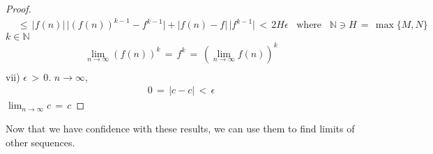 \begin{theorem}
\begin{proof}
\begin{align*}
        &\leq \hspace{2pt} \lvert f(n) \rvert \hspace{2pt} \lvert (f(n))^{k - 1} - f^{k - 1} \rvert + \lvert f(n) - f \rvert \hspace{2pt} \lvert f^{k - 1} \rvert \hspace{2pt} < \hspace{2pt} 2H \epsilon \hspace{10pt} \text{where} \hspace{10pt} \mathbb{N} \ni H \hspace{2pt} = \hspace{2pt} \max\{M, N\}
    \end{align*}
     $k \in \mathbb{N}$
    \begin{align*}
        \lim_{n \longrightarrow \infty} (f(n))^{k} \hspace{2pt} = \hspace{2pt} f^{k} \hspace{2pt} = \hspace{2pt} (\lim_{n \longrightarrow \infty} f(n))^{k} \\[4ex]
    \end{align*}
    vii)  $\epsilon \hspace{2pt} > \hspace{2pt} 0$.  $n \longrightarrow \infty,$ 
    \begin{align*}
        0 \hspace{2pt} = \hspace{2pt} \lvert c - c \rvert \hspace{2pt} < \hspace{2pt} \epsilon 
    \end{align*}
     $\lim_{n \longrightarrow \infty} c \hspace{2pt} = \hspace{2pt} c$
\end{proof}
\end{theorem}

Now that we have confidence with these results, we can use them to find limits of other sequences.

